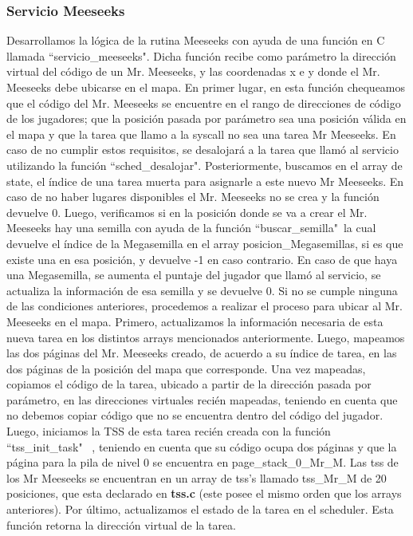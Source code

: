 \documentclass[a4paper]{article}
\begin{document}
\subsubsection{Servicio Meeseeks}
\justify
Desarrollamos la lógica de la rutina Meeseeks con ayuda de una función en C llamada ``servicio_meeseeks". Dicha función recibe como parámetro la dirección virtual del código de un Mr. Meeseeks, y las coordenadas x e y donde el Mr. Meeseeks debe ubicarse en el mapa. En primer lugar, en esta función chequeamos que el código del Mr. Meeseeks se encuentre en el rango de direcciones de código de los jugadores; que la posición pasada por parámetro sea una posición válida en el mapa y que la tarea que llamo a la syscall no sea una tarea Mr Meeseeks. En caso de no cumplir estos requisitos, se desalojará a la tarea que llamó al servicio utilizando la función ``sched_desalojar". Posteriormente, buscamos en el array de state, el índice de una tarea muerta para asignarle a este nuevo Mr Meeseeks. En caso de no haber lugares disponibles el Mr. Meeseeks no se crea y la función devuelve 0. Luego, verificamos si en la posición donde se va a crear el Mr. Meeseeks hay una semilla con ayuda de la función ``buscar_semilla"\, la cual devuelve el índice de la Megasemilla en el array posicion\_Megasemillas, si es que existe una en esa posición, y devuelve -1 en caso contrario. En caso de que haya una Megasemilla, se aumenta el puntaje del jugador que llamó al servicio, se actualiza la información de esa semilla y se devuelve 0. Si no se cumple ninguna de las condiciones anteriores, procedemos a realizar el proceso para ubicar al Mr. Meeseeks en el mapa. Primero, actualizamos la información necesaria de esta nueva tarea en los distintos arrays mencionados anteriormente. Luego, mapeamos las dos páginas del Mr. Meeseeks creado, de acuerdo a su índice de tarea, en las dos páginas de la posición del mapa que corresponde. Una vez mapeadas, copiamos el código de la tarea, ubicado a partir de la dirección pasada por parámetro, en las direcciones virtuales recién mapeadas, teniendo en cuenta que no debemos copiar código que no se encuentra dentro del código del jugador. Luego, iniciamos la TSS de esta tarea recién creada con la función ``tss_init_task" \ , teniendo en cuenta que su código ocupa dos páginas y que la página para la pila de nivel 0 se encuentra en page_stack_0_Mr_M. Las tss de los Mr Meeseeks se encuentran en un array de tss's llamado tss\_Mr\_M de 20 posiciones, que esta declarado en \textbf{tss.c} (este posee el mismo orden que los arrays anteriores). Por último, actualizamos el estado de la tarea en el scheduler. Esta función retorna la dirección virtual de la tarea.
\end{document}
